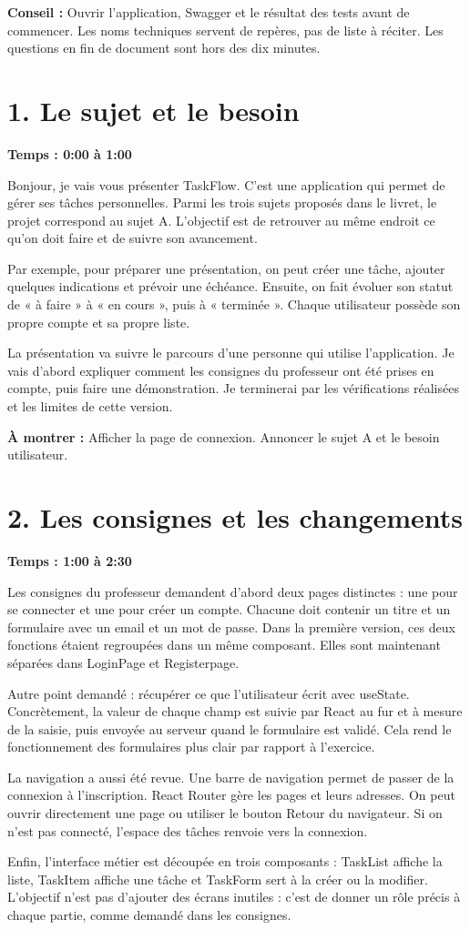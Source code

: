 \documentclass[11pt,a4paper]{article}
\newcommand{\partie}[2]{\section*{\textcolor{forest}{#1}}\textbf{Temps : #2}\par}
\newcommand{\action}[1]{\par\textcolor{muted}{\textbf{À montrer :} #1}\par}
\newcommand{\repere}[1]{\par\textcolor{muted}{\textbf{Conseil :} #1}\par}
\begin{document}
\repere{Ouvrir l'application, Swagger et le résultat des tests avant de commencer. Les noms techniques servent de repères, pas de liste à réciter. Les questions en fin de document sont hors des dix minutes.}
\newpage
\partie{1. Le sujet et le besoin}{0:00 à 1:00}

Bonjour, je vais vous présenter TaskFlow. C'est une application qui permet de gérer ses tâches personnelles. Parmi les trois sujets proposés dans le livret, le projet correspond au sujet A. L'objectif est de retrouver au même endroit ce qu'on doit faire et de suivre son avancement.

Par exemple, pour préparer une présentation, on peut créer une tâche, ajouter quelques indications et prévoir une échéance. Ensuite, on fait évoluer son statut de « à faire » à « en cours », puis à « terminée ». Chaque utilisateur possède son propre compte et sa propre liste.

La présentation va suivre le parcours d'une personne qui utilise l'application. Je vais d'abord expliquer comment les consignes du professeur ont été prises en compte, puis faire une démonstration. Je terminerai par les vérifications réalisées et les limites de cette version.

\action{Afficher la page de connexion. Annoncer le sujet A et le besoin utilisateur.}
\partie{2. Les consignes et les changements}{1:00 à 2:30}

Les consignes du professeur demandent d'abord deux pages distinctes : une pour se connecter et une pour créer un compte. Chacune doit contenir un titre et un formulaire avec un email et un mot de passe. Dans la première version, ces deux fonctions étaient regroupées dans un même composant. Elles sont maintenant séparées dans LoginPage et Registerpage.

Autre point demandé : récupérer ce que l'utilisateur écrit avec useState. Concrètement, la valeur de chaque champ est suivie par React au fur et à mesure de la saisie, puis envoyée au serveur quand le formulaire est validé. Cela rend le fonctionnement des formulaires plus clair par rapport à l'exercice.

La navigation a aussi été revue. Une barre de navigation permet de passer de la connexion à l'inscription. React Router gère les pages et leurs adresses. On peut ouvrir directement une page ou utiliser le bouton Retour du navigateur. Si on n'est pas connecté, l'espace des tâches renvoie vers la connexion.

Enfin, l'interface métier est découpée en trois composants : TaskList affiche la liste, TaskItem affiche une tâche et TaskForm sert à la créer ou la modifier. L'objectif n'est pas d'ajouter des écrans inutiles : c'est de donner un rôle précis à chaque partie, comme demandé dans les consignes.
\end{document}

